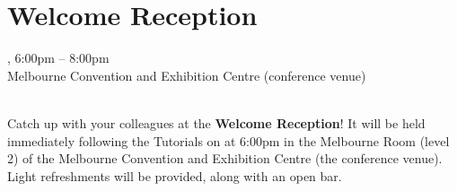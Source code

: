 \clearpage
\section[Welcome Reception]{Welcome Reception}
\setheaders{}{\daydateyear}

\begin{center}


\daydateyear, 6:00pm -- 8:00pm \vspace{1em}\\
Melbourne Convention and Exhibition Centre (conference venue)\\
\WelcomeReceptionLoc\\
\end{center}

\noindent Catch up with your colleagues at the \textbf{Welcome
Reception}! It will be held immediately following the Tutorials
on \daydate at 6:00pm in the Melbourne Room (level 2) of the 
Melbourne Convention and Exhibition Centre (the conference venue).  
Light refreshments will be provided, along with an
open bar.
